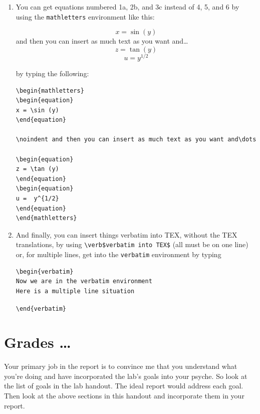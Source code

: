 \documentclass[12pt,preprint]{aastex}
\begin{document}
\begin{enumerate}
\item You can get equations numbered 1a, 2b, and 3c instead of 4, 5,
and 6 by using the \verb$mathletters$ environment like this:
\begin{mathletters}
\begin{equation}
x = \sin (y)
\end{equation}
\noindent and then you can insert as much text as you want and\dots
\begin{equation}
z = \tan (y)
\end{equation}
\begin{equation}
u =  y^{1/2}
\end{equation}
\end{mathletters}
by typing the following:
\begin{verbatim}
\begin{mathletters}
\begin{equation}
x = \sin (y)
\end{equation}

\noindent and then you can insert as much text as you want and\dots

\begin{equation}
z = \tan (y)
\end{equation}
\begin{equation}
u =  y^{1/2}
\end{equation}
\end{mathletters}
\end{verbatim}

\item And finally, you can insert things verbatim into TEX, without the
TEX translations, by using \verb=\verb$verbatim into TEX$= (all must be
on one line) or, for multiple lines, get into the \verb$verbatim$
environment by typing

\begin{verbatim}
\begin{verbatim}
Now we are in the verbatim environment
Here is a multiple line situation
\end{verbatim}
\verb$\end{verbatim}$
\end{enumerate}

\section{Grades \dots}

 Your primary job in the report is to convince me that you understand
 what you're doing and have incorporated the lab's goals into your
 psyche.  So look at the list of goals in the lab handout. The ideal
 report would address each goal. Then look at the above sections in this
 handout and incorporate them in your report.
\end{document}
